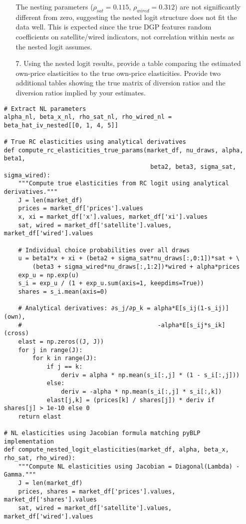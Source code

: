 \documentclass[english,11pt]{article}
\begin{document}
\begin{enumerate}
\begin{enumerate}
The nesting parameters ($\rho_{sat} = 0.115$, $\rho_{wired} = 0.312$) are not significantly different from zero, suggesting the nested logit structure does not fit the data well. This is expected since the true DGP features random coefficients on satellite/wired indicators, not correlation within nests as the nested logit assumes.

\item[7.] Using the nested logit results, provide a table comparing the
estimated own-price elasticities to the true own-price elasticities. Provide two
additional tables showing the true matrix of diversion ratios and the
diversion ratios implied by your estimates.
\end{enumerate}

\begin{verbatim}
# Extract NL parameters
alpha_nl, beta_x_nl, rho_sat_nl, rho_wired_nl = beta_hat_iv_nested[[0, 1, 4, 5]]

# True RC elasticities using analytical derivatives
def compute_rc_elasticities_true_params(market_df, nu_draws, alpha, beta1, 
                                         beta2, beta3, sigma_sat, sigma_wired):
    """Compute true elasticities from RC logit using analytical derivatives."""
    J = len(market_df)
    prices = market_df['prices'].values
    x, xi = market_df['x'].values, market_df['xi'].values
    sat, wired = market_df['satellite'].values, market_df['wired'].values
    
    # Individual choice probabilities over all draws
    u = beta1*x + xi + (beta2 + sigma_sat*nu_draws[:,0:1])*sat + \
        (beta3 + sigma_wired*nu_draws[:,1:2])*wired + alpha*prices
    exp_u = np.exp(u)
    s_i = exp_u / (1 + exp_u.sum(axis=1, keepdims=True))
    shares = s_i.mean(axis=0)
    
    # Analytical derivatives: ∂s_j/∂p_k = alpha*E[s_ij(1-s_ij)] (own),
    #                                      -alpha*E[s_ij*s_ik] (cross)
    elast = np.zeros((J, J))
    for j in range(J):
        for k in range(J):
            if j == k:
                deriv = alpha * np.mean(s_i[:,j] * (1 - s_i[:,j]))
            else:
                deriv = -alpha * np.mean(s_i[:,j] * s_i[:,k])
            elast[j,k] = (prices[k] / shares[j]) * deriv if shares[j] > 1e-10 else 0
    return elast

# NL elasticities using Jacobian formula matching pyBLP implementation
def compute_nested_logit_elasticities(market_df, alpha, beta_x, rho_sat, rho_wired):
    """Compute NL elasticities using Jacobian = Diagonal(Lambda) - Gamma."""
    J = len(market_df)
    prices, shares = market_df['prices'].values, market_df['shares'].values
    sat, wired = market_df['satellite'].values, market_df['wired'].values
    

\end{verbatim}
\end{enumerate}
\end{document}

